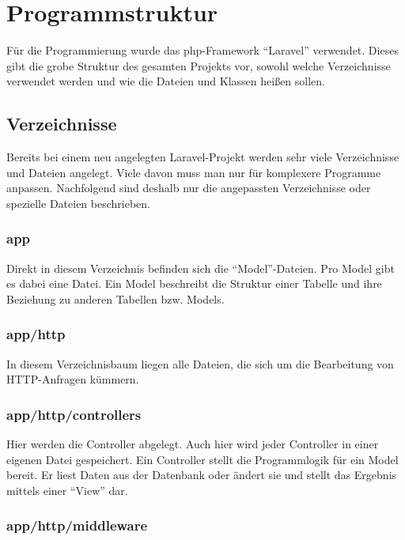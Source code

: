 \section{Programmstruktur}

Für die Programmierung wurde das php-Framework "`Laravel"' verwendet. Dieses gibt die grobe Struktur des gesamten Projekts vor, sowohl welche Verzeichnisse verwendet werden und wie die Dateien und Klassen heißen sollen. \cite{laravel}

\subsection{Verzeichnisse}

Bereits bei einem neu angelegten Laravel-Projekt werden sehr viele Verzeichnisse und Dateien angelegt. Viele davon muss man nur für komplexere Programme anpassen. Nachfolgend sind deshalb nur die angepassten Verzeichnisse oder spezielle Dateien beschrieben.

\subsubsection{app}

Direkt in diesem Verzeichnis befinden sich die "`Model"'-Dateien. Pro Model gibt es dabei eine Datei. Ein Model beschreibt die Struktur einer Tabelle und ihre Beziehung zu anderen Tabellen bzw. Models.

\subsubsection{app/http}

In diesem Verzeichnisbaum liegen alle Dateien, die sich um die Bearbeitung von HTTP-Anfragen kümmern.

\subsubsection{app/http/controllers}

Hier werden die Controller abgelegt. Auch hier wird jeder Controller in einer eigenen Datei gespeichert. Ein Controller stellt die Programmlogik für ein Model bereit. Er liest Daten aus der Datenbank oder ändert sie und stellt das Ergebnis mittels einer "`View"' dar.

\subsubsection{app/http/middleware} 

